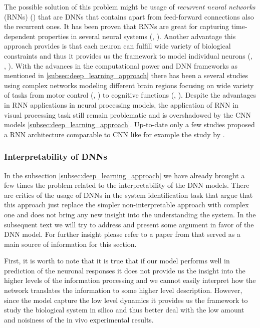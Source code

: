 The possible solution of this problem might be usage of \emph{recurrent neural networks} (RNNs) (\citet{medsker2001recurrent}) that are DNNs that contains apart from feed-forward connections also the recurrent ones. It has been proven that RNNs are great for capturing time-dependent properties in several neural systems (\citet{mante2013context}, \citet{song2016excinhrec}). Another advantage this approach provides is that each neuron can fulfill wide variety of biological constraints and thus it provides us the framework to model individual neurons (\citet{mante2013context}, \citet{masse2019circuit}, \citet{kim2019rnnframework}). With the advances in the computational power and DNN frameworks as mentioned in \ref{subsec:deep_learning_approach} there has been a several studies using complex networks modeling different brain regions focusing on wide variety of tasks from motor control (\citet{sussillo2015neural}, \citet{saxena2022motor}) to cognitive functions (\citet{masse2019circuit}, \citet{goudar2023schema}). Despite the advantages in RNN applications in neural processing models, the application of RNN in visual processing task still remain problematic and is overshadowed by the CNN models \ref{subsec:deep_learning_approach}. Up-to-date only a few studies proposed a RNN architecture comparable to CNN like for example the study by \citet{NEURIPS2024_f536d569}.

\subsubsection{Interpretability of DNNs}
\label{subsubsec:interpretability_dnn}
In the subsection \ref{subsec:deep_learning_approach} we have already brought a few times the problem related to the interpretability of the DNN models. There are critics of the usage of DNNs in the system identification task that argue that this approach just replace the simpler non-interpretable approach with complex one and does not bring any new insight into the understanding the system. In the subsequent text we will try to address and present some argument in favor of the DNN model. For further insight please refer to a paper from \citet{Kriegeskorte2015dnn} that served as a main source of information for this section.

First, it is worth to note that it is true that if our model performs well in prediction of the neuronal responses it does not provide us the insight into the higher levels of the information processing and we cannot easily interpret how the network translates the information to some higher level description. However, since the model capture the low level dynamics it provides us the framework to study the biological system in silico and thus better deal with the low amount and noisiness of the in vivo experimental results.


